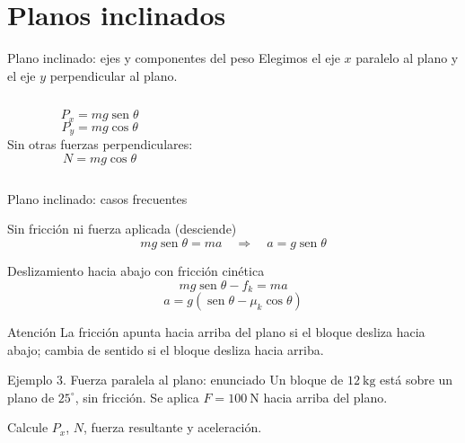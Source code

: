 \documentclass[aspectratio=169,11pt]{beamer}
\begin{document}
\section{Planos inclinados}
\begin{frame}{Plano inclinado: ejes y componentes del peso}
Elegimos el eje \(x\) paralelo al plano y el eje \(y\) perpendicular al plano.
\begin{columns}
\[\boxed{P_x=mg\operatorname{sen}\theta}\]
\[\boxed{P_y=mg\cos\theta}\]
Sin otras fuerzas perpendiculares:
\[\boxed{N=mg\cos\theta}\]
\centering
{}
\end{columns}
\end{frame}
\begin{frame}{Plano inclinado: casos frecuentes}
\begin{block}{Sin fricción ni fuerza aplicada (desciende)}
\[mg\operatorname{sen}\theta=ma\quad\Rightarrow\quad\boxed{a=g\operatorname{sen}\theta}\]
\end{block}
\begin{block}{Deslizamiento hacia abajo con fricción cinética}
\[mg\operatorname{sen}\theta-f_k=ma\]
\[\boxed{a=g(\operatorname{sen}\theta-\mu_k\cos\theta)}\]
\end{block}
\begin{alertblock}{Atención}
La fricción apunta hacia arriba del plano si el bloque desliza hacia abajo; cambia de sentido si el bloque desliza hacia arriba.
\end{alertblock}
\end{frame}
\begin{frame}{Ejemplo 3. Fuerza paralela al plano: enunciado}
Un bloque de \(12\ \mathrm{kg}\) está sobre un plano de \(25^\circ\), sin fricción. Se aplica \(F=100\ \mathrm{N}\) hacia arriba del plano.
\begin{center}
\end{center}
Calcule \(P_x\), \(N\), fuerza resultante y aceleración.
\end{frame}
\end{document}
